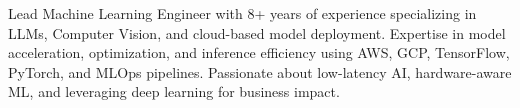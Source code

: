 

\begin{cvparagraph}

Lead Machine Learning Engineer with 8+ years of experience specializing 
in LLMs, Computer Vision, and cloud-based model deployment. Expertise in 
model acceleration, optimization, and inference efficiency using AWS, 
GCP, TensorFlow, PyTorch, and MLOps pipelines. Passionate about 
low-latency AI, hardware-aware ML, and leveraging deep learning for
 business impact.
\end{cvparagraph}
